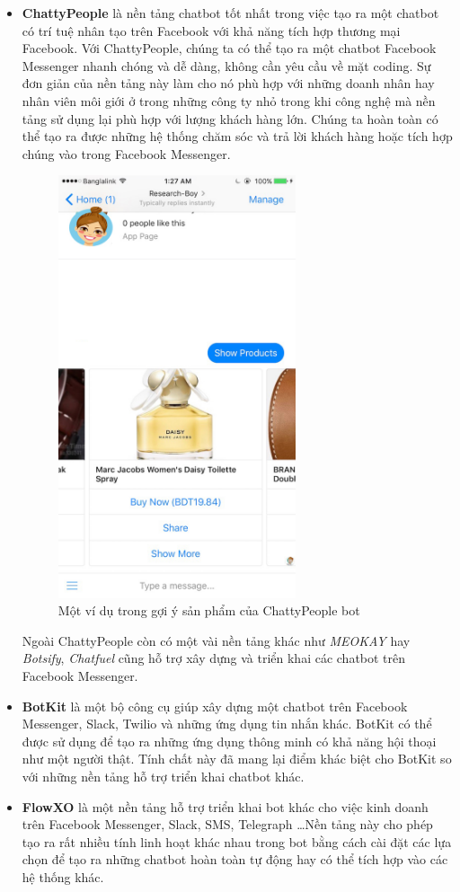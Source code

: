 \documentclass[12pt]{report}
\begin{document}
\begin{itemize}
	\item \textbf{ChattyPeople} là nền tảng chatbot tốt nhất trong việc tạo ra một chatbot có trí tuệ nhân tạo trên Facebook với khả năng tích hợp thương mại Facebook. Với ChattyPeople, chúng ta có thể tạo ra một chatbot Facebook Messenger nhanh chóng và dễ dàng, không cần yêu cầu về mặt coding. Sự đơn giản của nền tảng này làm cho nó phù hợp với những doanh nhân hay nhân viên môi giới ở trong những công ty nhỏ trong khi công nghệ mà nền tảng sử dụng lại phù hợp với lượng khách hàng lớn. Chúng ta hoàn toàn có thể tạo ra được những hệ thống chăm sóc và trả lời khách hàng hoặc tích hợp chúng vào trong Facebook Messenger.

	\begin{figure}[H]
	  \centering
	    \includegraphics[width=7cm]{Pics/Chap2/chatty-prople.jpg}
	  \caption{Một ví dụ trong gợi ý sản phẩm của ChattyPeople bot}
	\end{figure}

Ngoài ChattyPeople còn có một vài nền tảng khác như \textit{MEOKAY} hay \textit{Botsify}, \textit{Chatfuel} cũng hỗ trợ xây dựng và triển khai các chatbot trên Facebook Messenger.

	\item \textbf{BotKit} là một bộ công cụ giúp xây dựng một chatbot trên Facebook Messenger, Slack, Twilio và những ứng dụng tin nhắn khác. BotKit có thể được sử dụng để tạo ra những ứng dụng thông minh có khả năng hội thoại như một người thật. Tính chất này đã mang lại điểm khác biệt cho BotKit so với những nền tảng hỗ trợ triển khai chatbot khác.

	\item \textbf{FlowXO} là một nền tảng hỗ trợ triển khai bot khác cho việc kinh doanh trên Facebook Messenger, Slack, SMS, Telegraph \ldots Nền tảng này cho phép tạo ra rất nhiều tính linh hoạt khác nhau trong bot bằng cách cài đặt các lựa chọn để tạo ra những chatbot hoàn toàn tự động hay có thể tích hợp vào các hệ thống khác.
\end{itemize}
\end{document}
